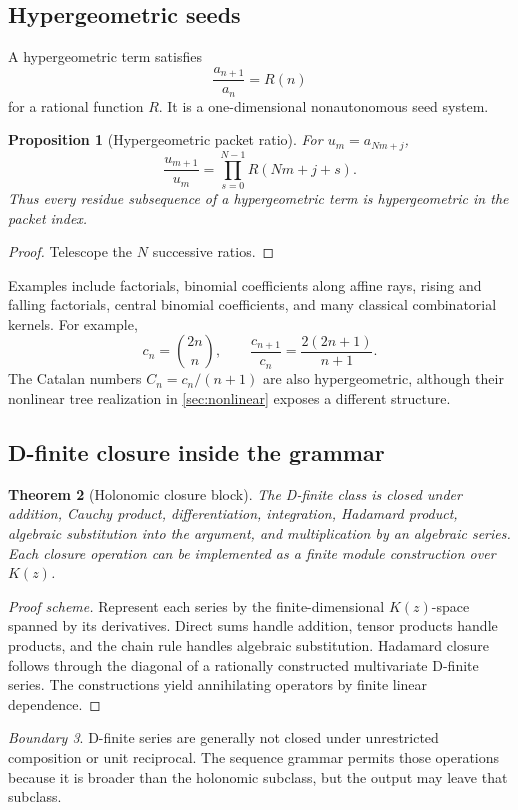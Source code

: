 \documentclass[11pt]{article}
\newtheorem{theorem}{Theorem}[section]\newtheorem{proposition}[theorem]{Proposition}\newtheorem{lemma}[theorem]{Lemma}\newtheorem{corollary}[theorem]{Corollary}
\theoremstyle{definition}\newtheorem{definition}[theorem]{Definition}\newtheorem{example}[theorem]{Example}\newtheorem{construction}[theorem]{Construction}\newtheorem{algorithm}[theorem]{Algorithm}\newtheorem{conjecture}[theorem]{Conjecture}\newtheorem{problem}[theorem]{Problem}
\theoremstyle{remark}\newtheorem{remark}[theorem]{Remark}\newtheorem{boundary}[theorem]{Boundary}\newtheorem{certificate}[theorem]{Computational Certificate}\newtheorem{classical}[theorem]{Classical Input}\newtheorem{principle}[theorem]{Structural Principle}
\begin{document}
\subsection{Hypergeometric seeds}
A hypergeometric term satisfies
\[
 \frac{a_{n+1}}{a_n}=R(n)
\]
for a rational function $R$.  It is a one-dimensional nonautonomous seed system.

\begin{proposition}[Hypergeometric packet ratio]
For $u_m=a_{Nm+j}$,
\[
 \boxed{\frac{u_{m+1}}{u_m}=\prod_{s=0}^{N-1}R(Nm+j+s).}
\]
Thus every residue subsequence of a hypergeometric term is hypergeometric in the packet index.
\end{proposition}
\begin{proof}
Telescope the $N$ successive ratios.
\end{proof}

Examples include factorials, binomial coefficients along affine rays, rising and falling factorials, central binomial coefficients, and many classical combinatorial kernels.  For example,
\[
 c_n=\binom{2n}{n},\qquad
 \frac{c_{n+1}}{c_n}=\frac{2(2n+1)}{n+1}.
\]
The Catalan numbers $C_n=c_n/(n+1)$ are also hypergeometric, although their nonlinear tree realization in \cref{sec:nonlinear} exposes a different structure.

\subsection{D-finite closure inside the grammar}
\begin{theorem}[Holonomic closure block]
The D-finite class is closed under addition, Cauchy product, differentiation, integration, Hadamard product, algebraic substitution into the argument, and multiplication by an algebraic series.  Each closure operation can be implemented as a finite module construction over $K(z)$.
\end{theorem}
\begin{proof}[Proof scheme]
Represent each series by the finite-dimensional $K(z)$-space spanned by its derivatives.  Direct sums handle addition, tensor products handle products, and the chain rule handles algebraic substitution.  Hadamard closure follows through the diagonal of a rationally constructed multivariate D-finite series.  The constructions yield annihilating operators by finite linear dependence.
\end{proof}

\begin{boundary}
D-finite series are generally not closed under unrestricted composition or unit reciprocal.  The sequence grammar permits those operations because it is broader than the holonomic subclass, but the output may leave that subclass.
\end{boundary}
\end{document}
